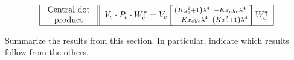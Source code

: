 \documentclass{ximera}
\begin{document}
\[{\begin{tabular}{|c||c|c|c|}
     \begin{minipage}{2cm}\begin{center}Central dot product\end{center}\end{minipage} & \multicolumn{3}{c|}{$V_c\cdot P_c\cdot W_c^\transpose = V_c\left[\begin{smallmatrix}\left(Ky_c^2+1\right)\lambda^4 & -Kx_{c}y_{c}\lambda^4\\
    -Kx_{c}y_{c}\lambda^4 & \left(Kx_c^2+1\right)\lambda^4\end{smallmatrix}\right] W_c^\transpose$}\\\hline
\end{tabular}}
\]




\begin{problem}
Summarize the results from this section. In particular, indicate which
results follow from the others.
\begin{freeResponse}
\end{freeResponse}
\end{problem}
\end{document}
